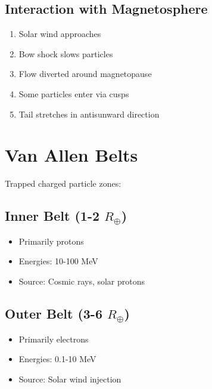\documentclass[
  11pt,
  letterpaper,
  twoside,
  openright]{book}
\providecommand{\tightlist}{%
  \setlength{\itemsep}{0pt}\setlength{\parskip}{0pt}}
\begin{document}
\subsection{Interaction with
Magnetosphere}\label{interaction-with-magnetosphere}

\begin{enumerate}
\def\labelenumi{\arabic{enumi}.}
\tightlist
\item
  Solar wind approaches
\item
  Bow shock slows particles
\item
  Flow diverted around magnetopause
\item
  Some particles enter via cusps
\item
  Tail stretches in antisunward direction
\end{enumerate}

\section{Van Allen Belts}\label{van-allen-belts}

Trapped charged particle zones:

\subsection{\texorpdfstring{Inner Belt (1-2
\(R_\oplus\))}{Inner Belt (1-2 R\_\textbackslash oplus)}}\label{inner-belt-1-2-r_oplus}

\begin{itemize}
\tightlist
\item
  Primarily protons
\item
  Energies: 10-100 MeV
\item
  Source: Cosmic rays, solar protons
\end{itemize}

\subsection{\texorpdfstring{Outer Belt (3-6
\(R_\oplus\))}{Outer Belt (3-6 R\_\textbackslash oplus)}}\label{outer-belt-3-6-r_oplus}

\begin{itemize}
\tightlist
\item
  Primarily electrons
\item
  Energies: 0.1-10 MeV
\item
  Source: Solar wind injection
\end{itemize}
\end{document}
